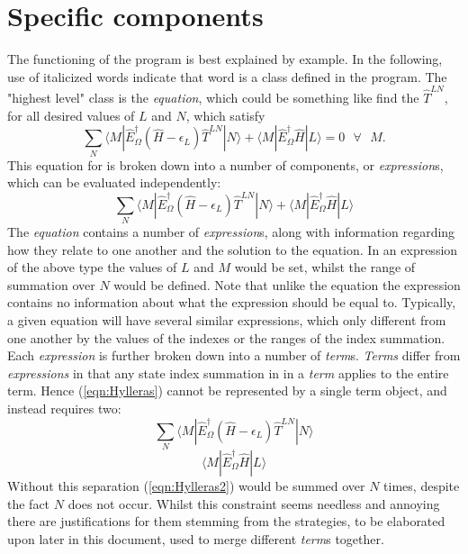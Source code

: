 \section*{Specific components}
The functioning of the program is best explained by example. In the following,
use of italicized words indicate that word is a class defined in the program.
The "highest level" class is the \emph{equation}, which could be something like 
find the $\hat{T}^{LN}$, for all desired values of $L$ and $N$, which satisfy 
\begin{equation}
\sum_{N} 
\langle M | \hat{E}^{\dagger}_{\Omega} (\hat{H}-\epsilon_{L}) \hat{T}^{LN} | N \rangle  +
\langle M | \hat{E}^{\dagger}_{\Omega} \hat{H} | L  \rangle = 0 \text{ \ \ \ \ } \forall \text{ \ \ }  M . 
\end{equation}
\noindent This equation for is broken down into a number of components, 
or \emph{expression}s, which can be evaluated independently:
\begin{equation}
\sum_{N} 
\langle M | \hat{E}^{\dagger}_{\Omega} (\hat{H}-\epsilon_{L}) \hat{T}^{LN} | N \rangle  +
\langle M | \hat{E}^{\dagger}_{\Omega} \hat{H} | L  \rangle  
\label{eqn:Hylleras}
\end{equation}
\noindent The \emph{equation} contains a number of \emph{expression}s, along with
information regarding how they relate to one another and the solution to the equation.
In an expression of the above type the values of $L$ and $M$  would be set, whilst the range of
summation over $N$ would be defined. Note that unlike the equation the expression
contains no information about what the expression should be equal to.
Typically, a given equation will have several similar expressions,
which only different from one another by the values of the indexes or the 
ranges of the index summation.\\

\noindent Each \emph{expression} is further broken down into a number of \emph{term}s.
\emph{Terms} differ from \emph{expressions} in that any state index summation in
in a \emph{term} applies to the entire term.
Hence (\ref{eqn:Hylleras}) cannot be represented by a single term object, and instead
requires two:
\begin{equation}
\sum_{N} 
\langle M | \hat{E}^{\dagger}_{\Omega} (\hat{H}-\epsilon_{L}) \hat{T}^{LN} | N \rangle  
\label{eqn:Hylleras1}
\end{equation}
\begin{equation}
\langle M | \hat{E}^{\dagger}_{\Omega} \hat{H} | L  \rangle  
\label{eqn:Hylleras2}
\end{equation}
\noindent Without this separation (\ref{eqn:Hylleras2}) would be summed over $N$ times,
despite the fact $N$ does not occur. 
Whilst this constraint seems needless and annoying there are justifications for them stemming
from the strategies, to be elaborated upon later in this document, used to merge different \emph{term}s together. \\ 

